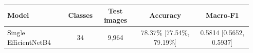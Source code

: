 \begin{tabular}{lcccc}
\toprule
\textbf{Model} & \textbf{Classes} & \textbf{Test images} & \textbf{Accuracy} & \textbf{Macro-F1} \\
\midrule
Single EfficientNetB4 & 34 & 9,964 & 78.37\% [77.54\%, 79.19\%] & 0.5814 [0.5652, 0.5937] \\
\bottomrule
\end{tabular}
